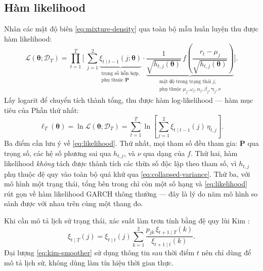\documentclass[12pt,a4paper]{article}
\numberwithin{equation}{section}
\theoremstyle{definition}
\newcommand{\Data}{\mathcal{D}}
\newcommand{\Param}{\symbf{\theta}}
\newcommand{\Pmat}{\symbf{P}}
\newcommand{\bmgamma}{\symbf{\gamma}}
\begin{document}
\subsection{Hàm likelihood}\label{subsec:likelihood}
Nhân các mật độ biên \eqref{eq:mixture-density} qua toàn bộ mẫu huấn luyện thu được hàm
likelihood:
\begin{equation}
  \mathcal{L}(\Param;\Data_T)
  =\prod_{t=1}^{T}
  \Bigg[\ \sum_{j=1}^{2}
  \underbrace{\xi_{t\mid t-1}(j;\Param)}_{\substack{\text{trọng số hỗn hợp,}\\ \text{phụ thuộc }\Pmat}}
  \cdot
  \underbrace{\frac{1}{\sqrt{h_{t,j}(\Param)}}\,
  f\!\left(\frac{r_t-\mu_j}{\sqrt{h_{t,j}(\Param)}}\right)}_{\substack{\text{mật độ trong trạng thái }j,\\ \text{phụ thuộc }\mu_j,\omega_j,\alpha_j,\beta_j,\bmgamma_j,\nu}}
  \Bigg].
  \label{eq:likelihood}
\end{equation}
Lấy logarit để chuyển tích thành tổng, thu được hàm log-likelihood --- hàm mục tiêu của
Phần thứ nhất:
\begin{equation}
  \ell_T(\Param)=\ln\mathcal{L}(\Param;\Data_T)
  =\sum_{t=1}^{T}\ln\!\left[\sum_{j=1}^{2}\xi_{t\mid t-1}(j)\,\eta_{t,j}\right].
  \label{eq:loglikelihood}
\end{equation}
Ba điểm cần lưu ý về \eqref{eq:likelihood}. Thứ nhất, mọi tham số đều tham gia: $\Pmat$
qua trọng số, các hệ số phương sai qua $h_{t,j}$, và $\nu$ qua dạng của $f$. Thứ hai, hàm
likelihood \emph{không} tách được thành tích các thừa số độc lập theo tham số, vì
$h_{t,j}$ phụ thuộc đệ quy vào toàn bộ quá khứ qua \eqref{eq:collapsed-variance}. Thứ ba,
với mô hình một trạng thái, tổng bên trong chỉ còn một số hạng và \eqref{eq:likelihood}
rút gọn về hàm likelihood GARCH thông thường --- đây là lý do năm mô hình so sánh được
với nhau trên cùng một thang đo.

Khi cần mô tả lịch sử trạng thái, xác suất làm trơn tính bằng đệ quy lùi Kim
\cite{kim1994}:
\begin{equation}
  \xi_{t\mid T}(j)=\xi_{t\mid t}(j)\sum_{k=1}^{2}
  \frac{p_{jk}\,\xi_{t+1\mid T}(k)}{\xi_{t+1\mid t}(k)}.
  \label{eq:kim-smoother}
\end{equation}
Đại lượng \eqref{eq:kim-smoother} sử dụng thông tin sau thời điểm $t$ nên chỉ dùng để mô
tả lịch sử, không dùng làm tín hiệu thời gian thực.
\end{document}
